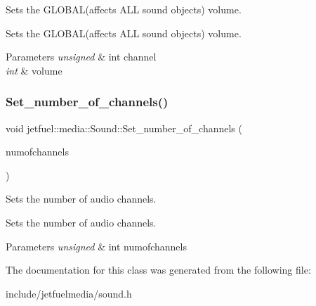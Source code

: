 Sets the G\+L\+O\+B\+A\+L(affects A\+L\+L sound objects) volume. 

Sets the G\+L\+O\+B\+A\+L(affects A\+L\+L sound objects) volume.


\begin{DoxyParams}{Parameters}
{\em unsigned} & int channel \\
\hline
{\em int} & volume \\
\hline
\end{DoxyParams}
\mbox{\label{classjetfuel_1_1media_1_1Sound_ac0bb67c175f71ab5977af3f5781cedd7}} 
\subsubsection{\texorpdfstring{Set\+\_\+number\+\_\+of\+\_\+channels()}{Set\_number\_of\_channels()}}
{\footnotesize\ttfamily void jetfuel\+::media\+::\+Sound\+::\+Set\+\_\+number\+\_\+of\+\_\+channels (\begin{DoxyParamCaption}\item[{const unsigned int}]{numofchannels }\end{DoxyParamCaption})\hspace{0.3cm}{\ttfamily [inline]}}



Sets the number of audio channels. 

Sets the number of audio channels.


\begin{DoxyParams}{Parameters}
{\em unsigned} & int numofchannels \\
\hline
\end{DoxyParams}


The documentation for this class was generated from the following file\+:\begin{DoxyCompactItemize}
\item 
include/jetfuelmedia/sound.\+h\end{DoxyCompactItemize}
